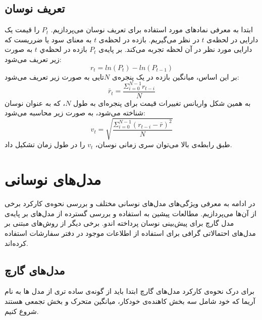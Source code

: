 \subsection{تعریف نوسان}
ابتدا به معرفی نماد‌های مورد استفاده برای تعریف نوسان می‌پردازیم. $P_t$ را قیمت یک دارایی در لحظه‌ی $t$ در نظر می‌گیریم. بازده در لحظه‌ی $t$ به معنای سود یا ضرریست که دارایی مورد نظر در آن لحظه‌ تجربه ‌می‌کند. بر پایه‌ی $P_t$ بازده در لحظه‌ي $t$ به صورت زیر تعریف می‌شود:
\begin{equation}
	\label{eq:t}
	r_t = ln(P_t) - ln(P_{t-1})
\end{equation}
بر این اساس، میانگین بازده در یک پنجره‌ی $N$تایی به صورت زیر تعریف می‌شود:
\begin{equation}
	\label{eq:t1}
		\bar{r}_t = \dfrac{\Sigma_{i=0}^{N-1} r_{t-i}}{N}
\end{equation}
به همین شکل واریانس تغییرات قیمت برای پنجره‌ای به طول $N$، که به عنوان نوسان شناخته می‌شود،‌ به صورت زیر محاسبه می‌شود:
\begin{equation}
	\label{eq:vol}
	v_t = \sqrt{\dfrac{\Sigma_{i=0}^{N-1} (r_{t-i}-\bar{r})^2}{N}}
\end{equation}
طبق رابطه‌ی بالا می‌توان سری زمانی نوسان، $v_t$ را در طول زمان تشکیل داد.
\section{مدل‌های نوسانی}
در ادامه به معرفی ویژگی‌های مدل‌های نوسانی مختلف و بررسی نحوه‌ی کارکرد برخی از آن‌ها می‌پردازیم. مطالعات پیشین به استفاده و بررسی گسترده از مدل‌های بر پایه‌ی مدل گارچ برای پیش‌بینی نوسان پرداخته اند\cite{katsiampa2017volatility}و\cite{liu2019volatility}. برخی دیگر از روش‌های مبتنی بر مدل‌های احتمالاتی گرافی برای استفاده از اطلاعات موجود در دفتر سفارشات استفاده کرده‌اند\cite{guo2018bitcoin}.\\
\subsection{مدل‌های گارچ}
برای درک نحوه‌ی کارکرد مدل‌های گارچ ابتدا باید از گونه‌ی ساده تری از مدل ها به نام آریما که خود شامل سه بخش کاهنده‌ی خودکار، میانگین متحرک و بخش تجمعی هستند شروع کنیم.
